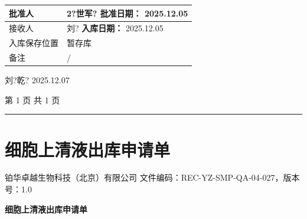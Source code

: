 \documentclass[UTF8,10pt,a4paper,fontset=fandol]{ctexart}
\newcommand{\fieldvalue}[1]{#1}
\newcommand{\handwritten}[1]{#1}
\begin{document}
\begin{tabular}{|p{2.8cm}|p{12.0cm}|}
\hline
批准人 &
\fieldvalue{\handwritten{2?世军?}}
\quad\quad
\textbf{批准日期：}
\fieldvalue{\handwritten{2025.12.05}}
\\
\hline
接收人 &
\fieldvalue{\handwritten{刘?}}
\quad\quad
\textbf{入库日期：}
\fieldvalue{\handwritten{2025.12.05}}
\\
\hline
入库保存位置 &
\fieldvalue{\handwritten{暂存库}}
\\
\hline
备注 &
\fieldvalue{\handwritten{/}}
\\
\hline
\end{tabular}

\vspace{4mm}

\handwritten{刘?乾?}
\qquad
\handwritten{2025.12.07}

\begin{center}
第 1 页 共 1 页
\end{center}

\vspace{8mm}
\hrule
\vspace{7mm}

\section*{细胞上清液出库申请单}

\noindent
铂华卓越生物科技（北京）有限公司 \hfill 文件编码：REC-YZ-SMP-QA-04-027，版本号：1.0

\begin{center}
\textbf{细胞上清液出库申请单}
\end{center}
\end{document}
